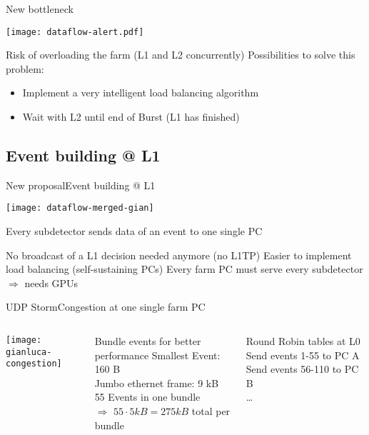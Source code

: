 \begin{frame}{New bottleneck}{}
	\begin{center} 
		\texttt{[image: dataflow-alert.pdf]}
	\end{center} 
	
	\begin{alertblock}{Risk of overloading the farm (L1 and L2 concurrently)}
		Possibilities to solve this problem:
		\begin{itemize}
		  	\item Implement a very intelligent load balancing algorithm 
  			\item Wait with L2 until end of Burst (L1 has finished)
		\end{itemize}
	\end{alertblock}
\end{frame}

\subsection{Event building @ L1}
\begin{frame}{New proposal}{Event building @ L1}
	\begin{center} 
		\texttt{[image: dataflow-merged-gian]}
	\end{center} 
	
	\begin{block}{Every subdetector sends data of an event to one single PC}
		\begin{itemize}
		  	\pro No broadcast of a L1 decision needed anymore (no L1TP)
		  	\pro Easier to implement load balancing (self-sustaining PCs)
  			\contra Every farm PC must serve every subdetector $\Rightarrow$ needs GPUs
		\end{itemize}
	\end{block}
\end{frame}

\begin{frame}{UDP Storm}{Congestion at one single farm PC}
\begin{columns}
			\texttt{[image: gianluca-congestion]}
	    	\begin{block}{Bundle events for better performance}
	    		Smallest Event: 160 B \\
	    		Jumbo ethernet frame: 9 kB \\
	    		55 Events in one bundle \\
				$\Rightarrow$ $55\cdot5kB=275 kB$ total per bundle	    		
			\end{block}
			\begin{block}{Round Robin tables at L0}
				Send events 1-55 to PC A \\
				Send events 56-110 to PC B \\
				\ldots
			\end{block}
	\end{columns}
\end{frame}

